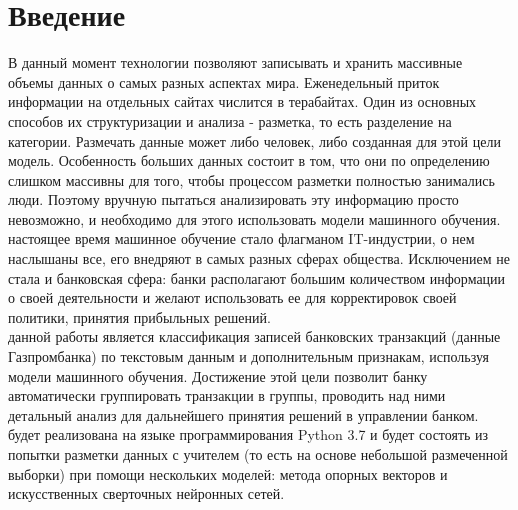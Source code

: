 \documentclass{article}
\newcommand\tab[1][1cm]{\hspace*{#1}}
\begin{document}
\newpage
	
\renewcommand*\contentsname{Содержание}
\makeatletter
\renewcommand{\l@section}{\@dottedtocline{1}{0em}{2em}}
\renewcommand{\l@subsection}{\@dottedtocline{1}{0em}{2.6em}}
\renewcommand{\l@subsubsection}{\@dottedtocline{1}{0em}{3.2em}}

\makeatother
\setcounter{page}{2}

\begin{center}
	\tableofcontents
\end{center}
\newpage
{}
\section*{Введение}
\tab В данный момент технологии позволяют записывать и хранить массивные объемы данных о самых разных аспектах мира. Еженедельный приток информации на отдельных сайтах числится в терабайтах. Один из основных способов их структуризации и анализа - разметка, то есть разделение на категории. Размечать данные может либо человек, либо созданная для этой цели модель. Особенность больших данных состоит в том, что они по определению слишком массивны для того, чтобы процессом разметки полностью занимались люди. Поэтому вручную пытаться анализировать эту информацию просто невозможно, и необходимо для этого использовать модели машинного обучения. \\
 настоящее время машинное обучение стало флагманом IT-индустрии, о нем наслышаны все, его внедряют в самых разных сферах общества. Исключением не стала и банковская сфера: банки располагают большим количеством информации о своей деятельности и желают использовать ее для корректировок своей политики, принятия прибыльных решений.\\
 данной работы является классификация записей банковских транзакций (данные Газпромбанка) по текстовым данным и дополнительным признакам, используя модели машинного обучения. Достижение этой цели позволит банку автоматически группировать транзакции в группы, проводить над ними детальный анализ для дальнейшего принятия решений в управлении банком.\\
 будет реализована на языке программирования Python 3.7 и будет состоять из попытки разметки данных с учителем (то есть на основе небольшой размеченной выборки) при помощи нескольких моделей: метода опорных векторов и искусственных сверточных нейронных сетей.\\
\newpage
\end{document}
